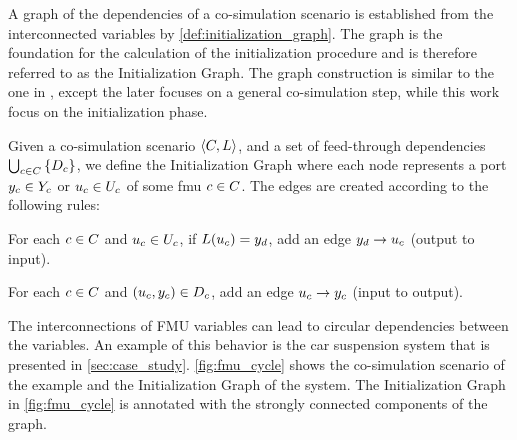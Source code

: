 

A graph of the dependencies of a co-simulation scenario is established from the interconnected variables by \cref{def:initialization_graph}. The graph is the foundation for the calculation of the initialization procedure and is therefore referred to as the Initialization Graph. The graph construction is similar to the one in \cite{Gomes2020b}, except the later focuses on a general co-simulation step, while this work focus on the initialization phase.

\begin{definition}\label{def:initialization_graph}
  Given a co-simulation scenario $ \left\langle C, L \right\rangle $, and a set of feed-through dependencies $\bigcup_{c \in C}  \left\{ D_{c} \right\}$, we define the Initialization Graph where each node represents a port $y_{c} \in Y_{c}$ or $u_{c} \in U_{c}$ of some fmu $c \in C$. The edges are created according to the following rules:
  \begin{compactenum}
    \item For each $c \in C$ and $u_{c} \in U_{c}$, if $L(u_{c}) = y_{d}$, add an edge $y_{d} -> u_{c}$ (output to input).
    \item For each $c \in C$ and $(u_{c},y_{c}) \in D_{c}$, add an edge $u_{c} -> y_{c}$ (input to output).
  \end{compactenum}
\end{definition}

The interconnections of FMU variables can lead to circular dependencies between the variables. An example of this behavior is the car suspension system that is presented in \cref{sec:case_study}. \cref{fig:fmu_cycle} shows the co-simulation scenario of the example and the Initialization Graph of the system. The Initialization Graph in \cref{fig:fmu_cycle} is annotated with the strongly connected components of the graph.

